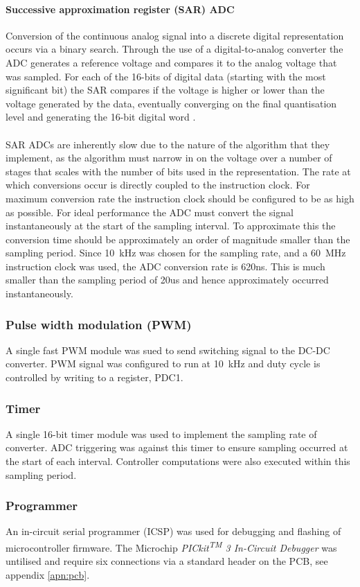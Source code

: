 \paragraph{Successive approximation register (SAR) ADC}
Conversion of the continuous analog signal into a discrete digital representation occurs via a binary search. Through the use of a digital-to-analog converter the ADC generates a reference voltage and compares it to the analog voltage that was sampled. For each of the 16-bits of digital data (starting with the most significant bit) the SAR compares if the voltage is higher or lower than the voltage generated by the data, eventually converging on the final quantisation level and generating the 16-bit digital word \cite{sar_adc}.
\\ \\
SAR ADCs are inherently slow due to the nature of the algorithm that they implement, as the algorithm must narrow in on the voltage over a number of stages that scales with the number of bits used in the representation. The rate at which conversions occur is directly coupled to the instruction clock. For maximum conversion rate the instruction clock should be configured to be as high as possible. For ideal performance the ADC must convert the signal instantaneously at the start of the sampling interval. To approximate this the conversion time should be approximately an order of magnitude smaller than the sampling period. Since \SI{10}{kHz} was chosen for the sampling rate, and a \SI{60}{MHz} instruction clock was used, the ADC conversion rate is 620ns. This is much smaller than the sampling period of 20us and hence approximately occurred instantaneously.
\subsubsection{Pulse width modulation (PWM)}
A single fast PWM module was sued to send switching signal to the DC-DC converter. PWM signal was configured to run at \SI{10}{kHz} and duty cycle is controlled by writing to a register, PDC1. 
\subsubsection{Timer}
A single 16-bit timer module was used to implement the sampling rate of converter. ADC triggering was against this timer to ensure sampling occurred at the start of each interval. Controller computations were also executed within this sampling period.

\subsubsection{Programmer}
An in-circuit serial programmer (ICSP) was used for debugging and flashing of microcontroller firmware. The Microchip \textit{PICkit\textsuperscript{TM} 3 In-Circuit Debugger} was untilised and require six connections via a standard header on the PCB, see appendix \ref{apn:pcb}.